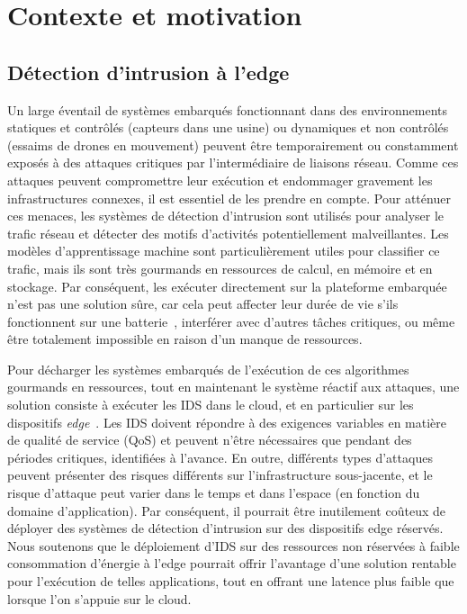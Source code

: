 \section{Contexte et motivation}
\label{section:herocache-background}

\subsection{Détection d'intrusion à l'edge}

Un large éventail de systèmes embarqués fonctionnant dans des environnements statiques et contrôlés (capteurs dans une usine) ou dynamiques et non contrôlés (essaims de drones en mouvement) peuvent être temporairement ou constamment exposés à des attaques critiques par l'intermédiaire de liaisons réseau. Comme ces attaques peuvent compromettre leur exécution et endommager gravement les infrastructures connexes, il est essentiel de les prendre en compte. Pour atténuer ces menaces, les systèmes de détection d'intrusion sont utilisés pour analyser le trafic réseau et détecter des motifs d'activités potentiellement malveillantes. Les modèles d'apprentissage machine sont particulièrement utiles pour classifier ce trafic, mais ils sont très gourmands en ressources de calcul, en mémoire et en stockage. Par conséquent, les exécuter directement sur la plateforme embarquée n'est pas une solution sûre, car cela peut affecter leur durée de vie s'ils fonctionnent sur une batterie~\cite{slimani:hal-04159551}, interférer avec d'autres tâches critiques, ou même être totalement impossible en raison d'un manque de ressources.

Pour décharger les systèmes embarqués de l'exécution de ces algorithmes gourmands en ressources, tout en maintenant le système réactif aux attaques, une solution consiste à exécuter les \gls{IDS} dans le cloud, et en particulier sur les dispositifs \textit{edge}~\cite{eskandari2020}. Les IDS doivent répondre à des exigences variables en matière de qualité de service (\gls{QoS}) et peuvent n'être nécessaires que pendant des périodes critiques, identifiées à l'avance. En outre, différents types d'attaques peuvent présenter des risques différents sur l'infrastructure sous-jacente, et le risque d'attaque peut varier dans le temps et dans l'espace (en fonction du domaine d'application). Par conséquent, il pourrait être inutilement coûteux de déployer des systèmes de détection d'intrusion sur des dispositifs edge réservés. Nous soutenons que le déploiement d'IDS sur des ressources non réservées à faible consommation d'énergie à l'edge pourrait offrir l'avantage d'une solution rentable pour l'exécution de telles applications, tout en offrant une latence plus faible que lorsque l'on s'appuie sur le cloud.

